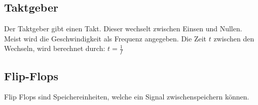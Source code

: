 \documentclass[12pt,a4paper]{article}
\begin{document}
\subsection{Taktgeber}
    Der Taktgeber gibt einen Takt. Dieser wechselt zwischen Einsen und Nullen. Meist wird die Geschwindigkeit als Frequenz angegeben. Die Zeit $t$ zwischen den Wechseln, wird berechnet durch: $t=\frac{1}{f}$
    \begin{center}
    \end{center}

\subsection{Flip-Flops}
    Flip Flops sind Speichereinheiten, welche ein Signal zwischenspeichern können.
\end{document}
